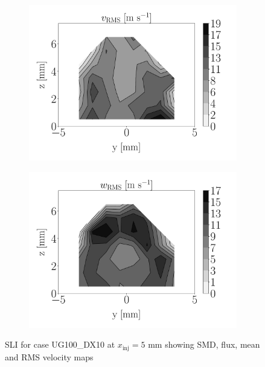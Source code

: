 \begin{figure}[h!]
\hspace*{0.45in}
\begin{subfigure}[b]{0.2\textwidth}
	\flushleft
   \includegraphics[scale=0.19]{./part2_developments/figures_ch6_lagrangian_JICF/injectors_SLI/uG100_dx10_x05_uy_RMS_map}
\end{subfigure}
\hspace*{0.35in}
\begin{subfigure}[b]{0.2\textwidth}
	\flushleft
   \includegraphics[scale=0.19]{./part2_developments/figures_ch6_lagrangian_JICF/injectors_SLI/uG100_dx10_x05_uz_RMS_map}
\end{subfigure}

\caption{SLI for case UG100\_DX10 at $x_\mathrm{inj} = 5$ mm showing SMD, flux, mean and RMS velocity maps}
\label{fig:maps_SLI_with_RMS}
\end{figure}

